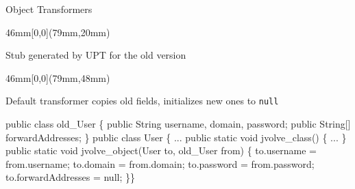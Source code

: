 \begin{frame}[fragile,shrink=5]{Object Transformers}%
 {
\begin{textblock*}{46mm}[0,0](79mm,20mm)
\begin{block}{}
Stub generated by UPT for the old version
\end{block}
\end{textblock*}
\begin{textblock*}{46mm}[0,0](79mm,48mm)
\begin{block}{}
Default transformer copies old fields, initializes new ones to
\texttt{null}
\end{block}
\end{textblock*}
}
\begin{small}
\begin{semiverbatim}
public class old_User \{
  public String username, domain, password;
  public String[] forwardAddresses;
\}
public class User \{
  ...
  public static void jvolve_class() \{ ... \}
  public static void jvolve_object(User to, old_User from) \{
    to.username = from.username;
    to.domain = from.domain;
    to.password = from.password;
    to.forwardAddresses = null;
    \}\}

\end{semiverbatim}
\end{small}
\end{frame}
